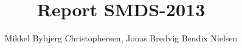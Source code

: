 \documentclass[]{report}
\title{Report SMDS-2013}
\author{Mikkel Bybjerg Christophersen, Jonas Bredvig Bendix Nielsen}
\begin{document}
\maketitle

\begin{abstract}
\end{abstract}
\end{document}

